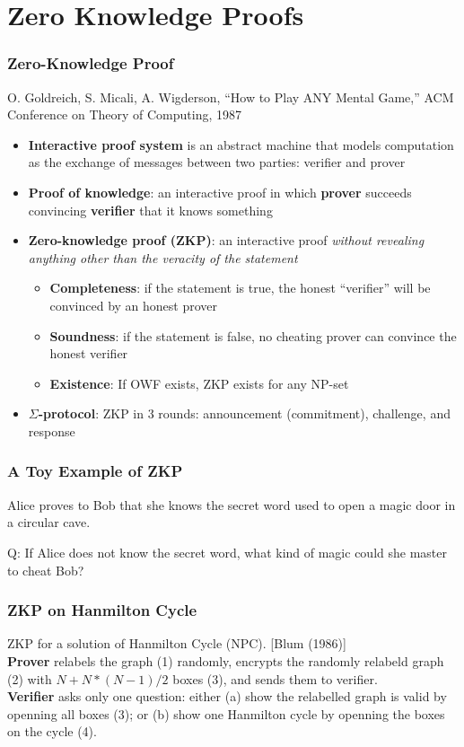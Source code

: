 \section{Zero Knowledge Proofs}
\begin{frame}\frametitle{Zero-Knowledge Proof}
O. Goldreich, S. Micali, A. Wigderson, ``How to Play ANY Mental Game,'' ACM Conference on Theory of Computing, 1987
\begin{itemize}
\item \textbf{Interactive proof system} is an abstract machine that models computation as the exchange of messages between two parties: verifier and prover
\item \textbf{Proof of knowledge}: an interactive proof in which \textbf{prover} succeeds convincing \textbf{verifier} that it knows something
\item \textbf{Zero-knowledge proof (ZKP)}: an interactive proof \emph{without revealing anything other than the veracity of the statement}
\begin{itemize}
\item \textbf{Completeness}: if the statement is true, the honest ``verifier'' will be convinced by an honest prover
\item \textbf{Soundness}: if the statement is false, no cheating prover can convince the honest verifier
\item \textbf{Existence}: If OWF exists, ZKP exists for any NP-set
\end{itemize}
\item \textbf{$\Sigma$-protocol}: ZKP in 3 rounds: announcement (commitment), challenge, and response
\end{itemize}
\end{frame}
\begin{frame}\frametitle{A Toy Example of ZKP}
Alice {\color{red} \LARGE \Ladiesroom} proves to Bob {\color{blue} \LARGE \Gentsroom} that she knows the secret word used to open a magic door in a circular cave.
\begin{figure}
\begin{center}

\end{center}
\end{figure}
\alert{Q: If Alice does not know the secret word, what kind of magic could she master to cheat Bob?}
\end{frame}
\begin{frame}\frametitle{ZKP on Hanmilton Cycle}
ZKP for a solution of Hanmilton Cycle (NPC). [Blum (1986)] \\
\textbf{Prover} relabels the graph (1) randomly, encrypts the randomly relabeld graph (2) with $N + N*(N-1)/2$ boxes (3), and sends them to verifier. \\
\textbf{Verifier} asks only one question: either (a) show the relabelled graph is valid by openning all boxes (3); or (b) show one Hanmilton cycle by openning the boxes on the cycle (4).
\begin{figure}
\begin{center}

\end{center}
\end{figure}
\end{frame}
